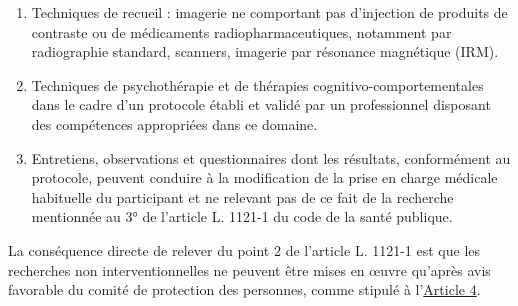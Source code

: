 \documentclass[
  12pt,
]{book}
\begin{document}
\begin{enumerate}
\def\labelenumi{\arabic{enumi})}
\item
  Techniques de recueil : imagerie ne comportant pas d'injection de produits de contraste ou de médicaments radiopharmaceutiques, notamment par radiographie standard, scanners, imagerie par résonance magnétique (IRM).
\item
  Techniques de psychothérapie et de thérapies cognitivo-comportementales dans le cadre d'un protocole établi et validé par un professionnel disposant des compétences appropriées dans ce domaine.
\item
  Entretiens, observations et questionnaires dont les résultats, conformément au protocole, peuvent conduire à la modification de la prise en charge médicale habituelle du participant et ne relevant pas de ce fait de la recherche mentionnée au 3° de l'article L. 1121-1 du code de la santé publique.
\end{enumerate}

La conséquence directe de relever du point 2 de l'article L. 1121-1 est que les recherches non interventionnelles ne peuvent être mises en œuvre qu'après avis favorable du comité de protection des personnes, comme stipulé à l'\href{https://www.legifrance.gouv.fr/codes/section_lc/LEGITEXT000006072665/LEGISCTA000006170998/\#LEGISCTA000032722874}{Article 4}.
\end{document}
